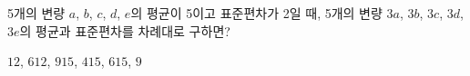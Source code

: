 5개의 변량 $a$, $b$, $c$, $d$, $e$의 평균이 5이고 표준편차가 2일 때, 5개의 변량 $3a$, $3b$, $3c$, $3d$, $3e$의 평균과 표준편차를 차례대로 구하면?
\begin{choices32}{$12$, $6$}{$12$, $9$}{$15$, $4$}{$15$, $6$}{$15$, $9$}\end{choices32}

